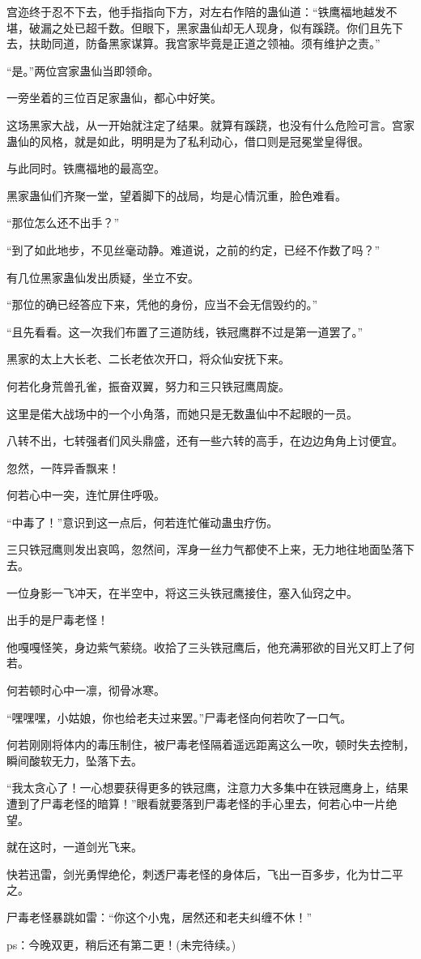 \begin{this_body}
宫迩终于忍不下去，他手指指向下方，对左右作陪的蛊仙道：“铁鹰福地越发不堪，破漏之处已超千数。但眼下，黑家蛊仙却无人现身，似有蹊跷。你们且先下去，扶助同道，防备黑家谋算。我宫家毕竟是正道之领袖。须有维护之责。”

“是。”两位宫家蛊仙当即领命。

一旁坐着的三位百足家蛊仙，都心中好笑。

这场黑家大战，从一开始就注定了结果。就算有蹊跷，也没有什么危险可言。宫家蛊仙的风格，就是如此，明明是为了私利动心，借口则是冠冕堂皇得很。

与此同时。铁鹰福地的最高空。

黑家蛊仙们齐聚一堂，望着脚下的战局，均是心情沉重，脸色难看。

“那位怎么还不出手？”

“到了如此地步，不见丝毫动静。难道说，之前的约定，已经不作数了吗？”

有几位黑家蛊仙发出质疑，坐立不安。

“那位的确已经答应下来，凭他的身份，应当不会无信毁约的。”

“且先看看。这一次我们布置了三道防线，铁冠鹰群不过是第一道罢了。”

黑家的太上大长老、二长老依次开口，将众仙安抚下来。

何若化身荒兽孔雀，振奋双翼，努力和三只铁冠鹰周旋。

这里是偌大战场中的一个小角落，而她只是无数蛊仙中不起眼的一员。

八转不出，七转强者们风头鼎盛，还有一些六转的高手，在边边角角上讨便宜。

忽然，一阵异香飘来！

何若心中一突，连忙屏住呼吸。

“中毒了！”意识到这一点后，何若连忙催动蛊虫疗伤。

三只铁冠鹰则发出哀鸣，忽然间，浑身一丝力气都使不上来，无力地往地面坠落下去。

一位身影一飞冲天，在半空中，将这三头铁冠鹰接住，塞入仙窍之中。

出手的是尸毒老怪！

他嘎嘎怪笑，身边紫气萦绕。收拾了三头铁冠鹰后，他充满邪欲的目光又盯上了何若。

何若顿时心中一凛，彻骨冰寒。

“嘿嘿嘿，小姑娘，你也给老夫过来罢。”尸毒老怪向何若吹了一口气。

何若刚刚将体内的毒压制住，被尸毒老怪隔着遥远距离这么一吹，顿时失去控制，瞬间酸软无力，坠落下去。

“我太贪心了！一心想要获得更多的铁冠鹰，注意力大多集中在铁冠鹰身上，结果遭到了尸毒老怪的暗算！”眼看就要落到尸毒老怪的手心里去，何若心中一片绝望。

就在这时，一道剑光飞来。

快若迅雷，剑光勇悍绝伦，刺透尸毒老怪的身体后，飞出一百多步，化为廿二平之。

尸毒老怪暴跳如雷：“你这个小鬼，居然还和老夫纠缠不休！”

ps：今晚双更，稍后还有第二更！(未完待续。)

\end{this_body}

